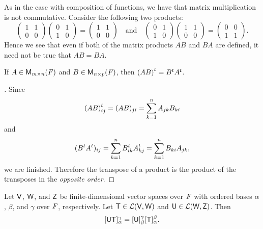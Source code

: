 \begin{note}
  As in the case with composition of functions, we have that matrix multiplication is not commutative. Consider the following two products:
  \[
    \begin{pmatrix}
      1 & 1 \\
      0 & 0
    \end{pmatrix} \begin{pmatrix}
      0 & 1 \\
      1 & 0
    \end{pmatrix} = \begin{pmatrix}
      1 & 1 \\
      0 & 0
    \end{pmatrix} \quad \text{and} \quad \begin{pmatrix}
      0 & 1 \\
      1 & 0
    \end{pmatrix} \begin{pmatrix}
      1 & 1 \\
      0 & 0
    \end{pmatrix} = \begin{pmatrix}
      0 & 0 \\
      1 & 1
    \end{pmatrix}.
  \]
  Hence we see that even if both of the matrix products \(AB\) and \(BA\) are defined, it need not be true that \(AB = BA\).
\end{note}

\begin{eg}\label{2.3.2}
  If \(A \in \ms\) and \(B \in \ms[n][p][\F]\), then \({(AB)}^{t} = {B}^{t} {A}^{t}\).
\end{eg}

\begin{proof}[]
  Since
  \[
    {(AB)}^{t}_{i j} = (AB)_{j i} = \sum_{k = 1}^n A_{j k} B_{k i}
  \]
  and
  \[
    ({B}^{t} {A}^{t})_{i j} = \sum_{k = 1}^n {B}^{t}_{i k} {A}^{t}_{k j} = \sum_{k = 1}^n B_{k i} A_{j k},
  \]
  we are finished.
  Therefore the transpose of a product is the product of the transposes in the \emph{opposite order}.
\end{proof}

\begin{thm}\label{2.11}
  Let \(\mathsf{V}\), \(\mathsf{W}\), and \(\mathsf{Z}\) be finite-dimensional vector spaces over \(\mathit{F}\) with ordered bases \(\alpha\), \(\beta\), and \(\gamma\) over \(\mathit{F}\), respectively.
  Let \(\mathsf{T} \in \mathcal{L}(\mathsf{V}, \mathsf{W})\) and \(\mathsf{U} \in \mathcal{L}(\mathsf{W}, \mathsf{Z})\).
  Then
  \[
    [\mathsf{U} \mathsf{T}]_{\alpha}^{\gamma} = [\mathsf{U}]_{\beta}^{\gamma} [\mathsf{T}]_{\alpha}^{\beta}.
  \]
\end{thm}

